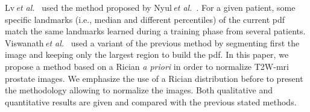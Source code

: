 Lv\,\textit{et al.}~\cite{lv2009computerized} used the method proposed by Nyul\,\textit{et al.}~\cite{nyul2000new}.
For a given patient, some specific landmarks (i.e., median and different percentiles) of the current \ac{pdf} match the same landmarks learned during a training phase from several patients.
Viswanath\,\textit{et al.}~\cite{viswanath2012central} used a variant of the previous method by segmenting first the image and keeping only the largest region to build the \ac{pdf}.
In this paper, we propose a method based on a Rician \textit{a priori} in order to normalize T2W-\ac{mri} prostate images. We emphasize the use of a Rician distribution before to present the methodology allowing to normalize the images. Both qualitative and quantitative results are given and compared with the previous stated methods.


